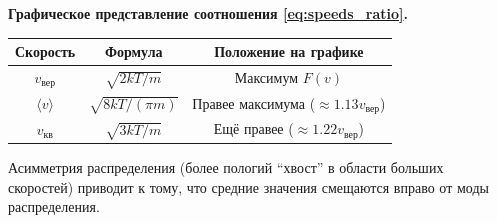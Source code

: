 \begin{remark}
\textbf{Графическое представление соотношения \eqref{eq:speeds_ratio}.}
\begin{center}
\begin{tabular}{|c|c|c|}
\hline
Скорость & Формула & Положение на графике \\
\hline
$v_{\text{вер}}$ & $\sqrt{2kT/m}$ & Максимум $F(v)$ \\
$\langle v \rangle$ & $\sqrt{8kT/(\pi m)}$ & Правее максимума ($\approx 1.13 v_{\text{вер}}$) \\
$v_{\text{кв}}$ & $\sqrt{3kT/m}$ & Ещё правее ($\approx 1.22 v_{\text{вер}}$) \\
\hline
\end{tabular}
\end{center}
Асимметрия распределения (более пологий ``хвост'' в области больших скоростей) приводит к тому, что средние значения смещаются вправо от моды распределения.
\end{remark}

